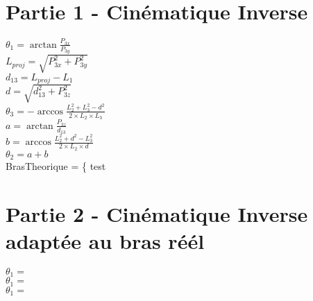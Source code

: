 \documentclass[ebook,12pt,oneside,openany]{memoir}
\begin{document}
\chapter{Partie 1 - Cinématique Inverse}

  $\theta _{1} = \arctan{\frac{P_{3x}}{P_{3y}}}$\\

  $L_{proj} = \sqrt{P_{3x}^{2} + P_{3y}^{2}}$\\
  
  $d_{13} = L_{proj} - L_{1}$\\
  
  $d = \sqrt{d_{13}^{2} + P_{3z}^{2}}$\\
  
  $\theta _{3} = - \arccos{\frac{L_{2}^{2} + L_{3}^{2} - d^{2}}{2 \times L_{2} \times L_{3}}}$\\
  
  $a = \arctan{\frac{P_{3z}}{d_{13}}}$\\
  
  $b = \arccos{\frac{L_{2}^{2} + d^{2} - L_{3}^{2}}{2 \times L_{2} \times d}}$\\
  
  $\theta _{2} = a + b$\\
  
  
  BrasTheorique = 
  \left\{
    test
  \right \\
  
\chapter{Partie 2 - Cinématique Inverse adaptée au bras réél}

  $\theta _{1} = $\\
  
  $\theta _{1} = $\\
  
  $\theta _{1} = $\\
\end{document}
